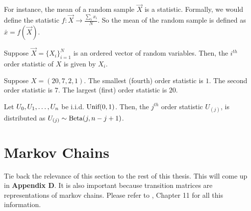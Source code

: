 \begin{example}
For instance, the mean of a random sample $\vec{X}$ is a statistic. Formally, we would define the statistic $f : \vec{X} \to \frac{\sum_i x_i}{N}$. So the mean of the random sample is defined as $\bar{x} = f(\vec{X})$.
\end{example}


\begin{definition}
Suppose $\vec{X} = \{X_i\}_{i = 1}^N$ is an ordered vector of random variables. Then, the $i^{th}$ order statistic of $X$ is given by $X_i$.
\end{definition}

\begin{example}
Suppose $X = (20,7,2,1)$. The smallest (fourth) order statistic is $1$. The second order statistic is $7$. The largest (first) order statistic is $20$.
\end{example}


\begin{theorem}
Let $\seq[n]{U}$ be i.i.d. $\Unif(0, 1)$. Then, the $j^{th}$ order statistic $U_{(j)}$, is distributed as $U_{(j)} \sim \Beta(j, n-j+1)$.
\end{theorem}

\newpage
\section{Markov Chains}


Tie back the relevance of this section to the rest of this thesis. This will come up in \textbf{Appendix D}. It is also important because transition matrices are representations of markov chains. Please refer to \cite{blitz}, Chapter 11 for all this information.

